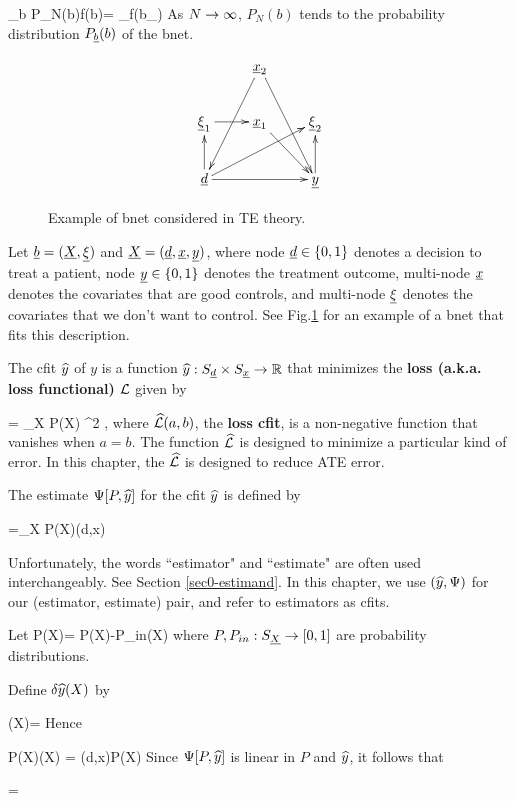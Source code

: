 \beq
\sum_b P_N(b)f(b)=
\sum_\s f(b_\s)
\eeq
As $N\rightarrow \infty$, $P_N(b)$ tends
to the probability distribution $P_{\underline{b}}(b)$
of the bnet.
\begin{figure}[h!]
$$
\xymatrix{
&\rvx_2\ar[ddl]\ar[ddr]
\\
\ul{\xi}_1\ar[r]
&\rvx_1\ar[dr]
&\ul{\xi}_2
\\
\rvd\ar[rr]\ar[u]\ar[rru]
&
&\rvy\ar[u]
}
$$
\caption{Example of bnet considered in TE
theory.}
\label{fig-targeted-bnet}
\end{figure}

Let ${\underline{b}}=({\underline{X}}, \underline{\xi})$ and
${\underline{X}}=({\underline{d}}, {\underline{x}},{\underline{y}})$,
where
node ${\underline{d}}\in\{0,1\}$ denotes a decision to treat a patient,
node ${\underline{y}}\in \{0,1\}$ denotes the treatment outcome,
multi-node ${\underline{x}}$ denotes the covariates
that are good controls, and multi-node $\underline{\xi}$ denotes
the covariates that we don't want to control.
See Fig.\ref{fig-targeted-bnet}
for an example of a bnet that fits this description.


The cfit ${\widehat{y}}$ of $y$
is a function ${\widehat{y}}:S_{\underline{d}}\times S_{\underline{x}}\rightarrow { \mathbb{R}}$
that minimizes the {\bf loss (a.k.a. loss functional)} ${\cal L}$
given by


\beq
\call[P, \haty]= \sum_X P(X) \hatl[y, \haty(d,x)]^2
\;,
\eeq
where $\widehat{{\cal L}}(a,b)$, the {\bf loss
cfit}, is a
non-negative function
that vanishes when $a=b$.
The function $\widehat{{\cal L}}$ is designed
to minimize a particular kind of error.
In this chapter, the $\widehat{{\cal L}}$
is designed to reduce ATE error.


The estimate
 $\Psi[P, {\widehat{y}}]$ for the cfit ${\widehat{y}}$
is defined by

\beq
\Psi[P, \haty] =\sum_X P(X)\haty(d,x)
\eeq

Unfortunately, the words ``estimator"
and ``estimate" are often used
interchangeably. See Section
\ref{sec0-estimand}.
In this chapter, we use $({\widehat{y}}, \Psi)$
for our (estimator, estimate) pair,
and refer to estimators as cfits.


Let
\beq
\delta P(X)=
P(X)-P_{in}(X)
\eeq
where $P, P_{in}:S_{\underline{X}}\rightarrow [0,1]$ are
probability distributions.

Define $\delta{\widehat{y}}(X)$ by

\beq
\delta\haty(X)= 
\eeq
Hence

\beq
P(X)\delta\haty(X) = \haty(d,x)\delta P(X)
\eeq
Since $\Psi[P, {\widehat{y}}]$
is linear in $P$ and ${\widehat{y}}$,
it follows that

\beq
{}=
\eeq



